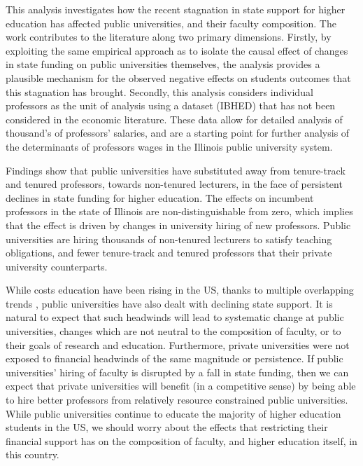\documentclass[notitlepage,12pt]{article}
\begin{document}
This analysis investigates how the recent stagnation in state support for higher education has affected public universities, and their faculty composition.
The work contributes to the literature along two primary dimensions.
Firstly, by exploiting the same empirical approach as \cite{NBERw23736,NBERw27885} to isolate the causal effect of changes in state funding on public universities themselves, the analysis provides a plausible mechanism for the observed negative effects on students outcomes that this stagnation has brought.
Secondly, this analysis considers individual professors as the unit of analysis using a dataset (IBHED) that has not been considered in the economic literature.
These data allow for detailed analysis of thousand's of professors' salaries, and are a starting point for further analysis of the determinants of professors wages in the Illinois public university system. 

Findings show that public universities have substituted away from tenure-track and tenured professors, towards non-tenured lecturers, in the face of persistent declines in state funding for higher education.
The effects on incumbent professors in the state of Illinois are non-distinguishable from zero, which implies that the effect is driven by changes in university hiring of new professors.
Public universities are hiring thousands of non-tenured lecturers to satisfy teaching obligations, and fewer tenure-track and tenured professors that their private university counterparts.

While costs education have been rising in the US, thanks to multiple overlapping trends \citep{ehrenberg2012}, public universities have also dealt with declining state support.
It is natural to expect that such headwinds will lead to systematic change at public universities, changes which are not neutral to the composition of faculty, or to their goals of research and education.
Furthermore, private universities were not exposed to financial headwinds of the same magnitude or persistence.
If public universities' hiring of faculty is disrupted by a fall in state funding, then we can expect that private universities will benefit (in a competitive sense) by being able to hire better professors from relatively resource constrained public universities.
While public universities continue to educate the majority of higher education students in the US, we should worry about the effects that restricting their financial support has on the composition of faculty, and  higher education itself, in this country.
\end{document}
